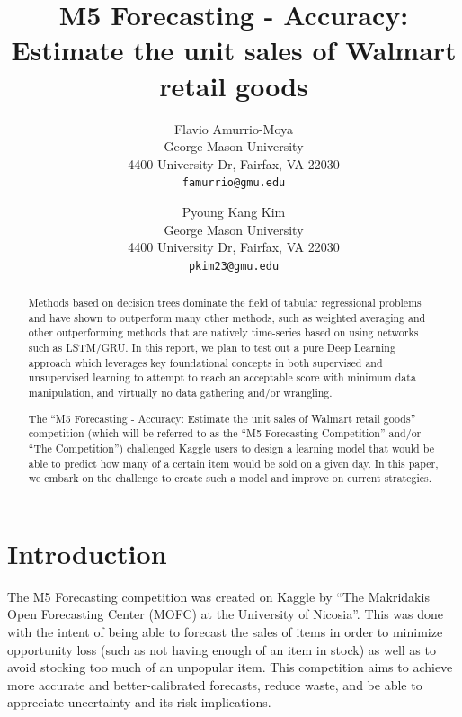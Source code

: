 \documentclass[10pt,twocolumn,letterpaper]{article}
\begin{document}
\title{M5 Forecasting - Accuracy: Estimate the unit sales of Walmart retail goods}

\author{Flavio Amurrio-Moya\\
George Mason University\\
4400 University Dr, Fairfax, VA 22030\\
{\tt\small famurrio@gmu.edu}
\and
Pyoung Kang Kim\\
George Mason University\\
4400 University Dr, Fairfax, VA 22030\\
{\tt\small pkim23@gmu.edu}
}

\maketitle
\thispagestyle{empty}

\begin{abstract}
  Methods based on decision trees dominate the field of tabular regressional
  problems and have shown to outperform many other methods, such as weighted
  averaging and other outperforming methods that
  are natively time-series based on using networks such as LSTM/GRU. In this
  report, we plan to test out a pure Deep Learning approach which leverages key
  foundational concepts in both supervised and unsupervised learning to attempt to
  reach an acceptable score with minimum data manipulation, and virtually no
  data gathering and/or wrangling.

  The ``M5 Forecasting - Accuracy: Estimate the unit sales of Walmart retail
  goods'' competition (which will be referred to as the ``M5 Forecasting Competition''
  and/or ``The Competition'') challenged Kaggle users to design a learning model
  that would be able to predict how many of a certain item would be sold on a
  given day. In this paper, we embark on the challenge to create such a model
  and improve on current strategies.

\end{abstract}

\section{Introduction}
The M5 Forecasting competition was created on Kaggle by ``The Makridakis Open
Forecasting Center (MOFC) at the University of Nicosia''. This was done with the
intent of being able to forecast the sales of items in order to minimize
opportunity loss (such as not having enough of an item in stock) as well as to
avoid stocking too much of an unpopular item. This competition aims to achieve
more accurate and better-calibrated forecasts, reduce waste, and be able to
appreciate uncertainty and its risk implications. \cite{kaggle}
\end{document}
